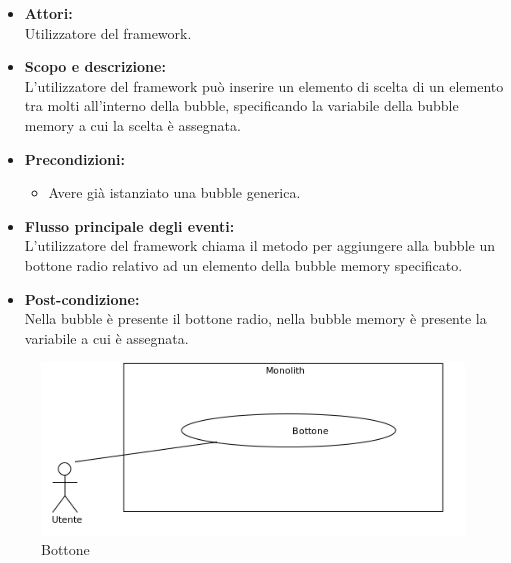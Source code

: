 \begin{itemize}
	\item \textbf{Attori:}
	\\Utilizzatore del framework.
	\item \textbf{Scopo e descrizione:} 
	\\L'utilizzatore del framework può inserire un elemento  di scelta di un elemento tra molti all'interno della bubble, specificando la variabile della bubble memory a cui la scelta è assegnata.
	\item \textbf{Precondizioni:}
	\begin{itemize}
		\item Avere già istanziato una bubble generica.
	\end{itemize}
	\item \textbf{Flusso principale degli eventi:}
	\\L'utilizzatore del framework chiama il metodo per aggiungere alla bubble un bottone radio relativo ad un elemento della bubble memory specificato.
	\item \textbf{Post-condizione:}
	\\Nella bubble è presente il bottone radio, nella bubble memory è presente la variabile a cui è assegnata.
\end{itemize}


\begin{figure}[H]
	\centering
	\includegraphics[width=15cm]{../../documenti/AnalisiDeiRequisiti/Diagrammi_img/uc1_32.png}
	\caption{\UCFCaption{} Bottone}
\end{figure}

